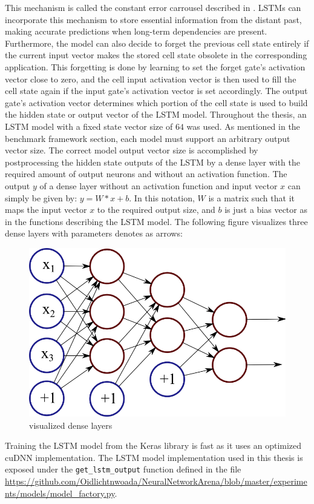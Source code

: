 \documentclass[draft,final]{vutinfth} %
\begin{document}
    This mechanism is called the constant error carrousel described in \cite[p. 7]{LSTM}.
    LSTMs can incorporate this mechanism to store essential information from the distant past, making accurate predictions when long-term dependencies are present.
    Furthermore, the model can also decide to forget the previous cell state entirely if the current input vector makes the stored cell state obsolete in the corresponding application.
    This forgetting is done by learning to set the forget gate's activation vector close to zero, and the cell input activation vector is then used to fill the cell state again if the input gate's activation vector is set accordingly.
    The output gate's activation vector determines which portion of the cell state is used to build the hidden state or output vector of the LSTM model.
    Throughout the thesis, an LSTM model with a fixed state vector size of $64$ was used. As mentioned in the benchmark framework section, each model must support an arbitrary output vector size.
    The correct model output vector size is accomplished by postprocessing the hidden state outputs of the LSTM by a dense layer with the required amount of output neurons and without an activation function.
    The output $y$ of a dense layer without an activation function and input vector $x$ can simply be given by: $y = W*x + b$.
    In this notation, $W$ is a matrix such that it maps the input vector $x$ to the required output size, and $b$ is just a bias vector as in the functions describing the LSTM model.
    The following figure visualizes three dense layers with parameters denotes as arrows:
    \begin{figure}[H]
        \centering{}
        \includegraphics[width=0.5\linewidth]{graphics/dense.png}
        \caption{visualized dense layers \cite{dense_vis}}
        \label{fig:lstm_vis}
    \end{figure}
    Training the LSTM model from the Keras library is fast as it uses an optimized cuDNN \cite{cuDNN} implementation.
    The LSTM model implementation used in this thesis is exposed under the \texttt{get\_lstm\_output} function defined in the file \url{https://github.com/Oidlichtnwoada/NeuralNetworkArena/blob/master/experiments/models/model_factory.py}.
\end{document}
